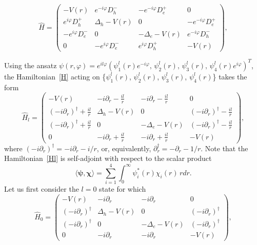 \documentclass[
aps,
prl,
groupedaddress,
superscriptaddress,
floatfix,
notitlepage
]{revtex4-1}
\def\p{\partial}
\begin{document}
\setlength\arraycolsep{7pt}
\renewcommand*{\arraystretch}{2}
\begin{equation}
\hat{H} =
\begin{pmatrix}
-V(r) &  e^{-i \varphi}D^-_h & -e^{-i \varphi}D^+_e & 0 \\
e^{i\varphi}D^+_h & \Delta_h-V(r) & 0 & -e^{-i\varphi}D^+_e \\
-e^{i\varphi}D^-_e & 0 & -\Delta_e-V(r) & e^{-i\varphi}D^-_h \\
0 & -e^{i\varphi}D^-_e & e^{i\varphi}D^+_h & -V(r)
\end{pmatrix},
\label{H}
\end{equation}

Using the ansatz
$\psi(r,\varphi) = e^{i l \varphi} \left(  \psi^l_1(r) e^{-i\varphi}, \,\psi^l_2(r), \,\psi^l_3(r), \,\psi^l_4(r) e^{i\varphi}\right)^T $, the Hamiltonian~\eqref{H} acting on \{$\psi^l_1(r)$, $\psi^l_2(r)$, $\psi^l_3(r)$, $\psi^l_4(r)$\} takes the form
\setlength\arraycolsep{7pt}
\renewcommand*{\arraystretch}{2}
\begin{equation}
\hat{H}_l =
\begin{pmatrix}
-V(r) &  -i\p_r - \frac{il}{r} & -i\p_r - \frac{il}{r} & 0 \\
(-i\p_r)^\dagger + \frac{il}{r} & \Delta_h-V(r) & 0 & (-i\p_r)^\dagger - \frac{il}{r} \\
(-i\p_r)^\dagger + \frac{il}{r} & 0 & -\Delta_e-V(r) & (-i\p_r)^\dagger - \frac{il}{r} \\
0 & -i\p_r + \frac{il}{r} & -i\p_r + \frac{il}{r} & -V(r)
\end{pmatrix},
\label{Hl}
\end{equation}
where $(-i\p_r)^\dagger = -i\p_r-i/r$, or, equivalently, $\p_r^\dagger = -\p_r-1/r$. Note that the Hamiltonian~\eqref{Hl} is self-adjoint with respect to the scalar product
$$
\langle \pmb\psi, \pmb\chi \rangle = \sum_{i=1}^4 \int_0^\infty \psi^*_i(r) \chi_i(r)\, r dr.
$$
Let us first consider the $l=0$ state for which
\setlength\arraycolsep{7pt}
\renewcommand*{\arraystretch}{2}
\begin{equation}
\hat{H}_0 =
\begin{pmatrix}
-V(r) &  -i\p_r & -i\p_r & 0 \\
(-i\p_r)^\dagger & \Delta_h-V(r) & 0 & (-i\p_r)^\dagger \\
(-i\p_r)^\dagger  & 0 & -\Delta_e-V(r) & (-i\p_r)^\dagger \\
0 & -i\p_r & -i\p_r & -V(r)
\end{pmatrix},
\label{Hl}
\end{equation}
\end{document}

